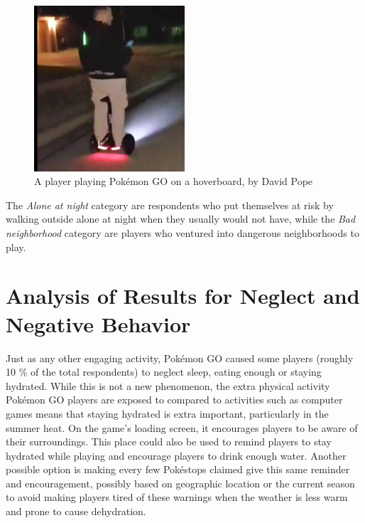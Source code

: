 \begin{figure}[h]
	\centering
	\includegraphics[width=0.5\textwidth]{Figures/segway-hoverboard-playing}
	\caption{A player playing Pokémon GO on a hoverboard, by David Pope}
\end{figure}

The \emph{Alone at night} category are respondents who put themselves at risk by walking outside alone at night when they usually would not have, while the \emph{Bad neighborhood} category are players who ventured into dangerous neighborhoods to play.

\section{Analysis of Results for Neglect and Negative Behavior}

Just as any other engaging activity, Pokémon GO caused some players (roughly 10 \% of the total respondents) to neglect sleep, eating enough or staying hydrated. While this is not a new phenomenon, the extra physical activity Pokémon GO players are exposed to compared to activities such as computer games means that staying hydrated is extra important, particularly in the summer heat. On the game's loading screen, it encourages players to be aware of their surroundings. This place could also be used to remind players to stay hydrated while playing and encourage players to drink enough water. Another possible option is making every few Pokéstops claimed give this same reminder and encouragement, possibly based on geographic location or the current season to avoid making players tired of these warnings when the weather is less warm and prone to cause dehydration.

